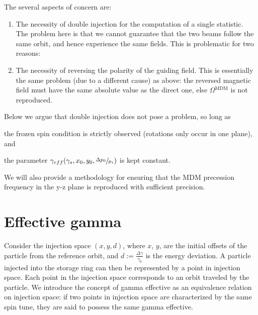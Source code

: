 \documentclass{article}
\newcommand{\W}{\Omega}
\newcommand{\MDM}{{}^\mathrm{MDM}}
\begin{document}
The several aspects of concern are:
\begin{enumerate}
\item The necessity of double injection for the computation of a single statistic. The problem here is that we cannot guarantee that the two beams follow the same orbit, and hence experience the same fields. This is problematic for two reasons: \label{itm:Injection}
  
  \item The necessity of reversing the polarity of the guiding field. This is essentially the same problem (due to a different cause) as above: the reversed magnetic field must have the same absolute value as the direct one, else $\W\MDM$ is not reproduced. \label{itm:Polarity}
\end{enumerate}

Below we argue that double injection does not pose a problem, so long as 
\begin{inparaenum}[a)]
\item the frozen spin condition is strictly observed (rotations only occur in one plane), and
\item the parameter $\gamma_{eff}(\gamma_s, x_0, y_0, \sfrac{\Delta p_0}{p_s})$ is kept constant.
\end{inparaenum}
We will also provide a methodology for ensuring that the MDM precession frequency in the y-z plane is reproduced with sufficient precision.

\section{Effective gamma}
Consider the injection space $(x,y,d)$, where $x$, $y$, are the initial offsets of the particle from the reference orbit, and $d := \frac{\Delta\gamma}{\gamma_0}$ is the energy deviation. A particle injected into the storage ring can then be represented by a point in injection space. Each point in the injection space corresponds to an orbit traveled by the particle. We introduce the concept of gamma effective as an equivalence relation on injection space: if two points in injection space are characterized by the same spin tune, they are said to possess the same gamma effective.
\end{document}
